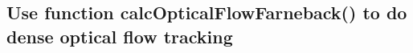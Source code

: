 \documentclass{article}
\begin{document}
\subsection{Use function  calcOpticalFlowFarneback() to do dense optical flow tracking}
 \quad
{} \quad
\end{document}
